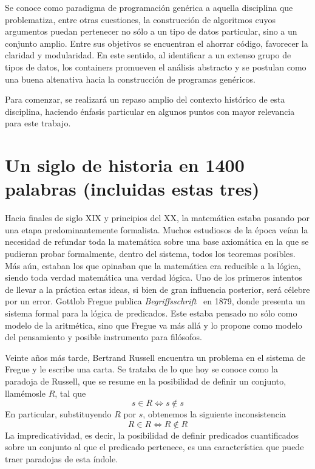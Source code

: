 Se conoce como paradigma de programación genérica a aquella disciplina que problematiza, entre otras cuestiones, la construcción de algoritmos cuyos argumentos puedan pertenecer no sólo a un tipo de datos particular, sino a un conjunto amplio. Entre sus objetivos se encuentran el ahorrar código, favorecer la claridad y modularidad. En este sentido, al identificar a un extenso grupo de tipos de datos, los containers promueven el análisis abstracto y se postulan como una buena altenativa hacia la construcción de programas genéricos.

Para comenzar, se realizará un repaso amplio del contexto histórico de esta disciplina, haciendo énfasis particular en algunos puntos con mayor relevancia para este trabajo.

\section*{Un siglo de historia en 1400 palabras (incluidas estas tres)}%

Hacia finales de siglo XIX y principios del XX, la matemática estaba pasando por una etapa predominantemente formalista. Muchos estudiosos de la época veían la necesidad de refundar toda la matemática sobre una base axiomática en la que se pudieran probar formalmente, dentro del sistema, todos los teoremas posibles. Más aún, estaban los que opinaban que la matemática era reducible a la lógica, siendo toda verdad matemática una verdad lógica. Uno de los primeros intentos de llevar a la práctica estas ideas, si bien de gran influencia posterior, será célebre por un error. Gottlob Fregue publica {\it Begriffsschrift}~ en 1879, donde presenta un sistema formal para la lógica de predicados. Este estaba pensado no sólo como modelo de la aritmética, sino que Fregue va más allá y lo propone como modelo del pensamiento y posible instrumento para filósofos.

Veinte años más tarde, Bertrand Russell encuentra un problema en el sistema de Fregue y le escribe una carta. Se trataba de lo que hoy se conoce como la paradoja de Russell, que se resume en la posibilidad de definir un conjunto, llamémosle $R$, tal que $$s \in R \Leftrightarrow s \notin s$$ En particular, substituyendo $R$ por $s$, obtenemos la siguiente inconsistencia $$R \in R \Leftrightarrow R \notin R$$
La impredicatividad, es decir, la posibilidad de definir predicados cuantificados sobre un conjunto al que el predicado pertenece, es una característica que puede traer paradojas de esta índole.

